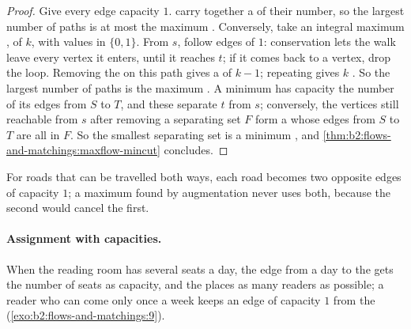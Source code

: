 \begin{proof}
Give every edge capacity $1$.  carry together a  of  their number, so the largest number of
paths is at most the maximum . Conversely, take an integral maximum , of  $k$, with values in $\{0, 1\}$.
From $s$, follow edges of  $1$: conservation lets the walk leave every vertex it enters, until it reaches $t$; if it
comes back to a vertex, drop the loop. Removing the  on this path gives a  of  $k - 1$; repeating gives $k$
. So the largest number of paths is the maximum . A minimum  has capacity the number of its
edges from $S$ to $T$, and these separate $t$ from $s$; conversely, the vertices still reachable from $s$ after removing
a separating set $F$ form a  whose edges from $S$ to $T$ are all in $F$. So the smallest separating set is a minimum
, and \cref{thm:b2:flows-and-matchings:maxflow-mincut} concludes.
\end{proof}

For roads that can be travelled both ways, each road becomes two opposite edges of capacity $1$; a maximum  found by
augmentation never uses both, because the second would cancel the first.

\label{out:b2:flows-and-matchings:disjoint}

\paragraph{Assignment with capacities.} When the reading room has several seats a day, the edge from a day to the 
gets the number of seats as capacity, and the  places as many readers as possible; a reader who can come only once a
week keeps an edge of capacity $1$ from the  (\cref{exo:b2:flows-and-matchings:9}).

